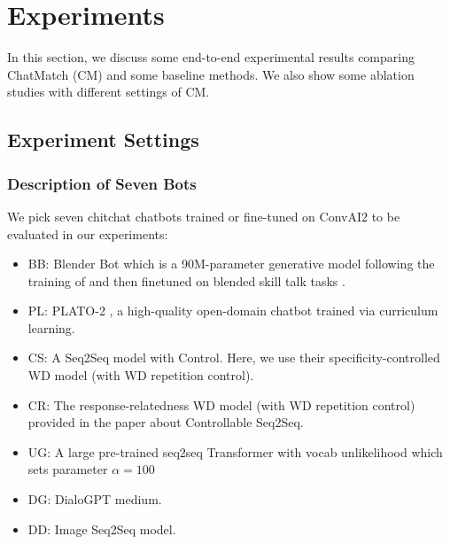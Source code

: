 \section{Experiments}
\label{sec:experiment}
In this section, we discuss some end-to-end experimental results 
comparing ChatMatch (CM) and some baseline methods. 
We also show some ablation studies with different settings of 
CM.

\subsection{Experiment Settings}

\subsubsection*{Description of Seven Bots}
We pick seven chitchat chatbots trained or fine-tuned on ConvAI2 \citep{dinan2019second} to be evaluated in our experiments:
\begin{itemize}
\item BB: Blender Bot \citep{roller2020recipes} which is a 
90M-parameter generative model following the training 
of \citet{shuster2020dialogue} and then finetuned on 
blended skill talk tasks \cite{smith2020together}.
\item PL: PLATO-2 \citep{bao2020plato}, a high-quality open-domain chatbot trained via curriculum learning.
\item CS: A Seq2Seq model with Control.  \citep{see2019makes} Here, we use their 
specificity-controlled WD model (with WD repetition control). 
\item CR: The response-relatedness WD model 
(with WD repetition control) provided in the paper about 
Controllable Seq2Seq. \citep{see2019makes}
\item UG: A large pre-trained seq2seq Transformer
with vocab unlikelihood which sets parameter 
$\alpha = 100$ \citep{li2020dont}
\item DG: DialoGPT medium. \citep{zhang2020dialogpt}
\item DD: Image Seq2Seq model. \citep{shuster2020dialogue}
\end{itemize}
 
